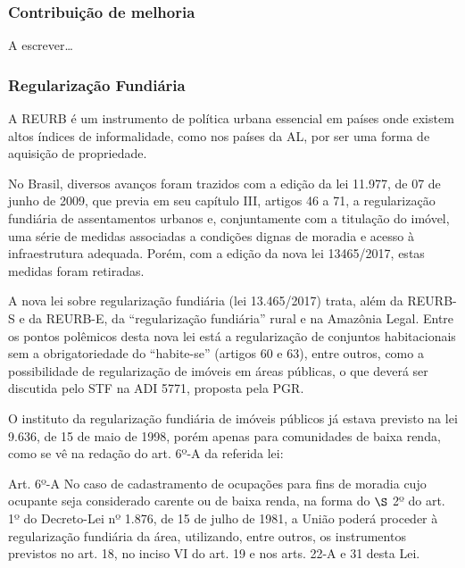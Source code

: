 \documentclass[
	12pt,				%
	oneside,			%
	a4paper,			%
	chapter=TITLE,		%
	section=TITLE,		%
	english,			%
	brazil				%
	]{abntex2}
\begin{document}
\begin{refsection}
\hypertarget{contribuiuxe7uxe3o-de-melhoria}{%
\subsubsection{Contribuição de melhoria}\label{contribuiuxe7uxe3o-de-melhoria}}

A escrever\ldots{}

\hypertarget{regularizauxe7uxe3o-fundiuxe1ria}{%
\subsubsection{Regularização Fundiária}\label{regularizauxe7uxe3o-fundiuxe1ria}}

A \gls{REURB} é um instrumento de política urbana essencial em países onde
existem altos índices de informalidade, como nos países da \gls{AL}, por
ser uma forma de aquisição de propriedade.

No Brasil, diversos avanços foram trazidos com a edição da lei 11.977, de 07 de
junho de 2009, que previa em seu capítulo III, artigos 46 a 71, a regularização
fundiária de assentamentos urbanos e, conjuntamente com a titulação do imóvel,
uma série de medidas associadas a condições dignas de moradia e acesso à
infraestrutura adequada. Porém, com a edição da nova lei 13465/2017, estas
medidas foram retiradas.

A nova lei sobre regularização fundiária (lei 13.465/2017) trata, além da
\gls{REURB-S} e da \gls{REURB-E}, da ``regularização fundiária'' rural e na
Amazônia Legal. Entre os pontos polêmicos desta nova lei está a regularização de
conjuntos habitacionais sem a obrigatoriedade do ``habite-se'' (artigos 60 e 63),
entre outros, como a possibilidade de regularização de imóveis em áreas
públicas, o que deverá ser discutida pelo \gls{STF} na \gls{ADI} 5771, proposta
pela \gls{PGR}.

O instituto da regularização fundiária de imóveis públicos já estava previsto na
lei 9.636, de 15 de maio de 1998, porém apenas para comunidades de baixa renda,
como se vê na redação do art. 6º-A da referida lei:
\begin{citacao}
Art. 6º-A No caso de cadastramento de ocupações para fins de moradia cujo
ocupante seja considerado carente ou de baixa renda, na forma do $\S$ 2º do art.
1º do Decreto-Lei nº 1.876, de 15 de julho de 1981, a União poderá proceder à
regularização fundiária da área, utilizando, entre outros, os instrumentos
previstos no art. 18, no inciso VI do art. 19 e nos arts. 22-A e 31 desta Lei.
\end{citacao}
\hypertarget{exemplo-de-regularizauxe7uxe3o-fundiuxe1ria-de-imuxf3vel-puxfablico-ponta-do-leal-florianuxf3polissc}{%
}
\end{refsection}
\end{document}
